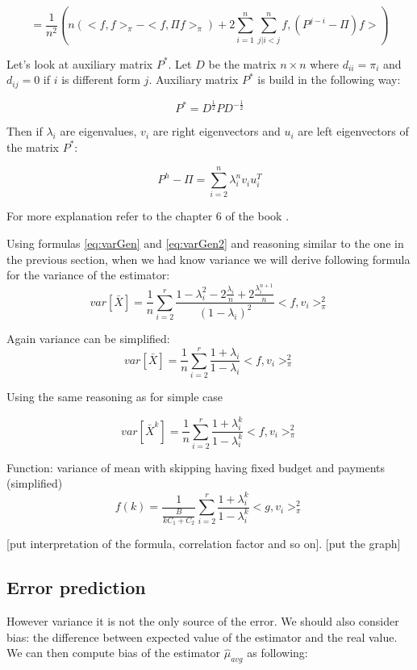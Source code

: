 \documentclass[12pt]{report}
\begin{document}
\begin{equation}\label{eq:varGen}
 = \frac{1}{n^2} \left( n(<f, f>_{\pi} - <f, \Pi f>_{\pi}) + 2\sum_{i=1}^n \sum_{j|i < j}^n  f, (P^{j-i} - \Pi)f> \right)
\end{equation}



Let's look at auxiliary matrix $P^*$. Let $D$ be the matrix $n \times n$ where $d_{ii} = \pi_i$ and $d_{ij} = 0$ if $i$ is different form $j$. Auxiliary matrix $P^*$ is build in the following way:

$$P^* = D^{\frac{1}{2}} P D^{-\frac{1}{2}}$$


Then if $\lambda_i$ are eigenvalues, $v_i$ are right eigenvectors and $u_i$ are left eigenvectors of the matrix $P^*$:

\begin{equation}\label{eq:varGen2}
P^h - \Pi = \sum_{i = 2}^n \lambda_i^n v_i u_i^T
\end{equation}

For more explanation refer to the chapter 6 of the book \cite{bremaud2013markov}.

Using formulas \ref{eq:varGen} and \ref{eq:varGen2} and reasoning similar to the one in the previous section, when we had know variance we will derive following formula for the variance of the estimator:
$$ var\left[\bar{X} \right] = \frac{1}{n} \sum_{i=2}^r\frac{1-\lambda_i^2 - 2\frac{\lambda_i}{n} + 2\frac{\lambda_i^{n+1}}{n}}{(1 - \lambda_i)^2} <f, v_i>^2_{\pi}$$

Again variance can be simplified:
$$ var\left[\bar{X} \right] = \frac{1}{n} \sum_{i=2}^r\frac{1 + \lambda_i}{1 - \lambda_i} <f, v_i>^2_{\pi}$$

Using the same reasoning as for simple case 

$$ var\left[\bar{X}^k \right] = \frac{1}{n} \sum_{i=2}^r\frac{1 + \lambda_i^k}{1 - \lambda_i^k} <f, v_i>^2_{\pi}$$

Function: variance of mean with skipping having fixed budget and payments (simplified)
$$ f(k) = \frac{1}{\frac{B}{kC_1 + C_2}} \sum_{i=2}^r\frac{1 + \lambda_i^k}{1 - \lambda_i^k} <g, v_i>^2_{\pi}$$

[put interpretation of the formula, correlation factor and so on].
[put the graph]
\subsection{Error prediction}

However variance it is not the only source of the error. We should also consider bias: the difference between expected value of the estimator and the real value. We can then compute bias of the estimator $\hat{\mu}_{avg}$ as following:
\end{document}
